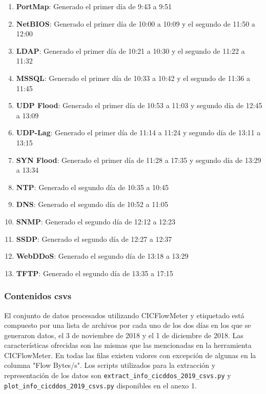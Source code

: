 \begin{enumerate}
    \item \textbf{PortMap}: Generado el primer día de 9:43 a 9:51
    \item \textbf{NetBIOS}: Generado el primer día de 10:00 a 10:09 y el segundo de 11:50 a 12:00
    \item \textbf{LDAP}: Generado el primer día de 10:21 a 10:30 y el segundo de 11:22 a 11:32
    \item \textbf{MSSQL}: Generado el primer día de 10:33 a 10:42 y el segundo de 11:36 a 11:45
    \item \textbf{UDP Flood}: Generado el primer día de 10:53 a 11:03 y segundo día de 12:45 a 13:09
    \item \textbf{UDP-Lag}: Generado el primer día de 11:14 a 11:24 y segundo día de 13:11 a 13:15
    \item \textbf{SYN Flood}: Generado el primer día de 11:28 a 17:35 y segundo día de 13:29 a 13:34
    \item \textbf{NTP}: Generado el segundo día de 10:35 a 10:45
    \item \textbf{DNS}: Generado el segundo día de 10:52 a 11:05
    \item \textbf{SNMP}: Generado el segundo día de 12:12 a 12:23
    \item \textbf{SSDP}: Generado el segundo día de 12:27 a 12:37
    \item \textbf{WebDDoS}: Generado el segundo día de 13:18 a 13:29
    \item \textbf{TFTP}: Generado el segundo día de 13:35 a 17:15
\end{enumerate}

\subsubsection{Contenidos csvs}

El conjunto de datos procesados utilizando CICFlowMeter y etiquetado está compuesto por una lista de archivos por cada uno de los dos días en los que se generaron datos, el 3 de noviembre de 2018 y el 1 de diciembre de 2018. Las características ofrecidas son las mismas que las mencionadas en la herramienta CICFlowMeter. En todas las filas existen valores con excepción de algunas en la columna "Flow Bytes/s". Los scripts utilizados para la extracción y representación de los datos son \texttt{extract\_info\_cicddos\_2019\_csvs.py} y \texttt{plot\_info\_cicddos\_2019\_csvs.py} disponibles en el anexo 1.

